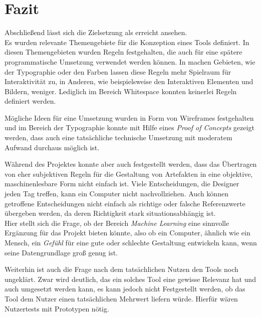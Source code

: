 
\chapter{Fazit} %

\label{Fazit} %


Abschließend lässt sich die Zielsetzung als erreicht ansehen. \\
Es wurden relevante Themengebiete für die Konzeption eines Tools definiert. In diesen Themengebieten wurden Regeln festgehalten, die auch für eine spätere programmatische Umsetzung verwendet werden können. In machen Gebieten, wie der Typographie oder den Farben lassen diese Regeln mehr Spielraum für Interaktivität zu, in Anderen, wie beispielsweise den Interaktiven Elementen und Bildern, weniger. Lediglich im Bereich Whitespace konnten keinerlei Regeln definiert werden.

Mögliche Ideen für eine Umsetzung wurden in Form von Wireframes festgehalten und im Bereich der Typographie konnte mit Hilfe eines \textit{Proof of Concepts} gezeigt werden, dass auch eine tatsächliche technische Umsetzung mit moderatem Aufwand durchaus möglich ist.

Während des Projektes konnte aber auch festgestellt werden, dass das Übertragen von eher subjektiven Regeln für die Gestaltung von Artefakten in eine objektive, maschinenlesbare Form nicht einfach ist. Viele Entscheidungen, die Designer jeden Tag treffen, kann ein Computer nicht nachvollziehen. Auch können getroffene Entscheidungen nicht einfach als richtige oder falsche Referenzwerte übergeben werden, da deren Richtigkeit stark situationsabhängig ist. \\
Hier stellt sich die Frage, ob der Bereich \textit{Machine Learning} eine sinnvolle Ergänzung für das Projekt bieten könnte, also ob ein Computer, ähnlich wie ein Mensch, ein \textit{Gefühl} für eine gute oder schlechte Gestaltung entwickeln kann, wenn seine Datengrundlage groß genug ist.

Weiterhin ist auch die Frage nach dem tatsächlichen Nutzen den Tools noch ungeklärt. Zwar wird deutlich, das ein solches Tool eine gewisse Relevanz hat und auch umgesetzt werden kann, es kann jedoch nicht Festgestellt werden, ob das Tool dem Nutzer einen tatsächlichen Mehrwert liefern würde. Hierfür wären Nutzertests mit Prototypen nötig. 


\clearpage